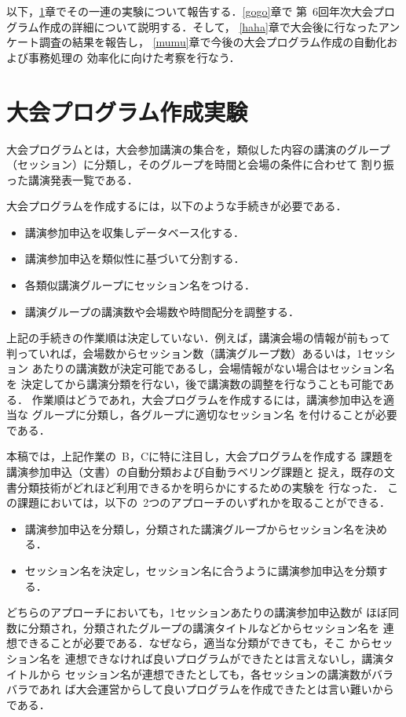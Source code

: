 以下，\ref{yaya}章でその一連の実験について報告する．\ref{gogo}章で
第\ 6回年次大会プログラム作成の詳細について説明する．そして，
\ref{haha}章で大会後に行なったアンケート調査の結果を報告し，
\ref{mumu}章で今後の大会プログラム作成の自動化および事務処理の
効率化に向けた考察を行なう．

\section{大会プログラム作成実験}
\label{yaya}
大会プログラムとは，大会参加講演の集合を，類似した内容の講演のグループ
（セッション）に分類し，そのグループを時間と会場の条件に合わせて
割り振った講演発表一覧である．

大会プログラムを作成するには，以下のような手続きが必要である．

\begin{itemize}
\item[A] 講演参加申込を収集しデータベース化する．
\item[B] 講演参加申込を類似性に基づいて分割する．
\item[C] 各類似講演グループにセッション名をつける．
\item[D] 講演グループの講演数や会場数や時間配分を調整する．
\end{itemize}

上記の手続きの作業順は決定していない．例えば，講演会場の情報が前もって
判っていれば，会場数からセッション数（講演グループ数）あるいは，1セッション
あたりの講演数が決定可能であるし，会場情報がない場合はセッション名を
決定してから講演分類を行ない，後で講演数の調整を行なうことも可能である．
作業順はどうであれ，大会プログラムを作成するには，講演参加申込を適当な
グループに分類し，各グループに適切なセッション名
を付けることが必要である．

本稿では，上記作業の\ B，Cに特に注目し，大会プログラムを作成する
課題を講演参加申込（文書）の自動分類および自動ラベリング課題と
捉え，既存の文書分類技術がどれほど利用できるかを明らかにするための実験を
行なった．
この課題においては，以下の\ 2つのアプローチのいずれかを取ることができる．
\begin{itemize}
\item[1] 講演参加申込を分類し，分類された講演グループからセッション名を決める．
\item[2] セッション名を決定し，セッション名に合うように講演参加申込を分類する．
\end{itemize}

どちらのアプローチにおいても，1セッションあたりの講演参加申込数が
ほぼ同数に分類され，分類されたグループの講演タイトルなどからセッション名を
連想できることが必要である．なぜなら，適当な分類ができても，そこ
からセッション名を
連想できなければ良いプログラムができたとは言えないし，講演タイトルから
セッション名が連想できたとしても，各セッションの講演数がバラバラであれ
ば大会運営からして良いプログラムを作成できたとは言い難いからである．

